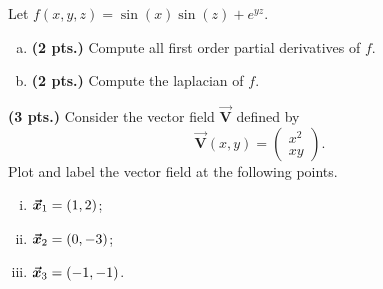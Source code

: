 \documentclass[12pt]{amsbook}
\newcommand{\vecfieldV}{\boldsymbol{\vec{V}}}
\begin{document}
\begin{problem}
    Let $f(x,y,z) = \sin(x)\sin(z)+e^{yz}$.
    \begin{enumerate}[(a)]
        \item \textbf{(2 pts.)} Compute all first order partial derivatives of $f$.
        \item \textbf{(2 pts.)} Compute the laplacian of $f$. 
    \end{enumerate}
\end{problem}

\newpage
\begin{problem}
\textbf{(3 pts.)} Consider the vector field $\vecfieldV$ defined by
    \[
        \vecfieldV(x,y) = \begin{pmatrix} x^2 \\ xy \end{pmatrix}.
    \]
    Plot and label the vector field at the following points.
\begin{enumerate}[i.]
    \item $\boldsymbol{\boldsymbol{\vec{x}}}_1 = (1,2)$;
    \item $\boldsymbol{\boldsymbol{\vec{x}}}_2 = (0,-3)$;
    \item $\boldsymbol{\boldsymbol{\vec{x}}}_3 = (-1,-1)$.
\end{enumerate}
\end{problem}
\end{document}
